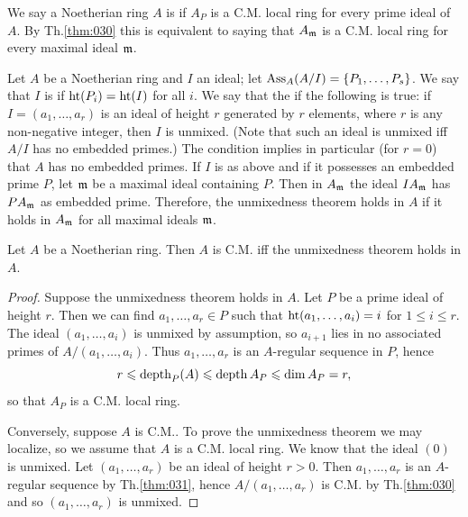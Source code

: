 \documentclass[../main]{subfiles}
\begin{document}
\newparagraph We say a Noetherian ring $A$ is  if $A_P$ is a C.M. local ring for every prime ideal of $A$. By Th.\ref{thm:030} this is equivalent to saying that $A_{\mathfrak{m}}$ is a C.M. local ring for every maximal ideal $\mathfrak{m}$.

Let $A$ be a Noetherian ring and $I$ an ideal; let $\operatorname{Ass}_A(A / I)=\{P_1, \dots, P_s\}$. We say that $I$ is  if $\operatorname{ht}(P_i)=\operatorname{ht}(I)$ for all $i$. We say that the  if the following is true: if $I=(a_1, \ldots, a_r)$ is an ideal of height $r$ generated by $r$ elements, where $r$ is any non-negative integer, then $I$ is unmixed. (Note that such an ideal is unmixed iff $A / I$ has no embedded primes.) The condition implies in particular (for $r=0$) that $A$ has no embedded primes. If $I$ is as above and if it possesses an embedded prime $P$, let $\mathfrak{m}$ be a maximal ideal containing $P$. Then in $A_{\mathfrak{m}}$ the ideal $IA_{\mathfrak{m}}$ has $PA_{\mathfrak{m}}$ as embedded prime. Therefore, the unmixedness theorem holds in $A$ if it holds in $A_{\mathfrak{m}}$ for all maximal ideals $\mathfrak{m}$.

\begin{theorem}\label{thm:032}
Let $A$ be a Noetherian ring. Then $A$ is C.M. iff the unmixedness theorem holds in $A$.
\end{theorem}

\begin{proof}
Suppose the unmixedness theorem holds in $A$. Let $P$ be a prime ideal of height $r$. Then we can find $a_1, \ldots, a_r \in P$ such that $\operatorname{ht} (a_1, \dots, a_i)=i$ for $1 \leqslant i \leqslant r$. The ideal $(a_1, \ldots, a_i)$ is unmixed by assumption, so $a_{i+1}$ lies in no associated primes of $A /(a_1, \ldots, a_i)$. Thus $a_1, \ldots, a_r$ is an $A$-regular sequence in $P$, hence \[r \leqslant \operatorname{depth}_P(A) \leqslant \operatorname{depth} A_P \leqslant \operatorname{dim} A_P=r,\] so that $A_P$ is a C.M. local ring.

Conversely, suppose $A$ is C.M.. To prove the unmixedness theorem we may localize, so we assume that $A$ is a C.M. local ring. We know that the ideal $(0)$ is unmixed. Let $(a_1, \ldots, a_r)$ be an ideal of height $r>0$. Then $a_1, \ldots, a_r$ is an $A$-regular sequence by Th.\ref{thm:031}, hence $A /(a_1, \ldots, a_r)$ is C.M. by Th.\ref{thm:030} and so $(a_1, \ldots, a_r)$ is unmixed.
\end{proof}
\end{document}
